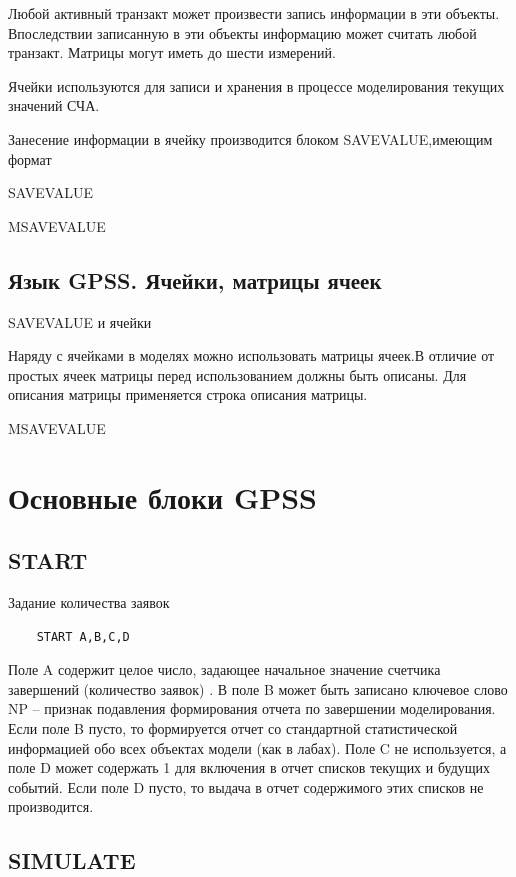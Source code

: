 \documentclass[14pt]{extarticle}
\begin{document}
Любой активный транзакт может произвести запись информации в эти объекты. Впоследствии записанную в эти объекты информацию может считать любой транзакт. Матрицы могут иметь до шести измерений.

Ячейки используются для записи и хранения в процессе моделирования текущих значений СЧА.

Занесение информации в ячейку производится блоком SAVEVALUE,имеющим формат

SAVEVALUE

MSAVEVALUE

\subsection*{Язык GPSS. Ячейки, матрицы ячеек}

SAVEVALUE и ячейки

Наряду с ячейками в моделях можно использовать матрицы ячеек.В отличие от простых ячеек матрицы перед использованием должны быть описаны. Для описания матрицы применяется строка описания матрицы.

MSAVEVALUE

\newpage

\section*{Основные блоки GPSS}

\subsection*{START}

Задание количества заявок

\begin{lstlisting}
	START A,B,C,D
\end{lstlisting}

Поле A содержит целое число, задающее начальное значение счетчика завершений (количество заявок) . В поле B может быть записано ключевое слово NP – признак подавления формирования отчета по завершении моделирования. Если поле B пусто, то формируется отчет со стандартной статистической информацией обо всех объектах модели (как в лабах). Поле C не используется, а поле D может содержать 1 для включения в отчет списков текущих и будущих событий. Если поле D пусто, то выдача в отчет содержимого этих списков не производится.


\subsection*{SIMULATE}
\end{document}
